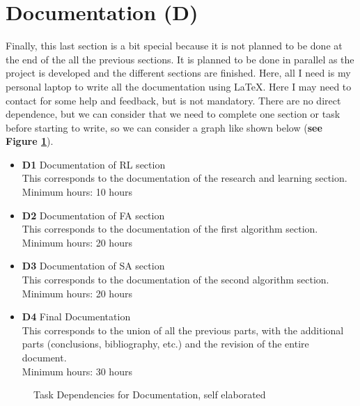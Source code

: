 \section{Documentation \textbf{(D)}}
Finally, this last section is a bit special because it is not planned to be done at the end of the all the previous sections.
It is planned to be done in parallel as the project is developed and the different sections are finished.
Here, all I need is my personal laptop to write all the documentation using \LaTeX.
Here I may need to contact for some help and feedback, but is not mandatory.
There are no direct dependence, but we can consider that we need to complete one section or task before starting to write, so we can consider a graph like shown below (\textbf{see Figure \ref{D_dependences}}).
\begin{itemize}
    \item \textbf{D1} Documentation of RL section \\
        This corresponds to the documentation of the research and learning section. \\
        Minimum hours: 10 hours
    \item \textbf{D2} Documentation of FA section\\
        This corresponds to the documentation of the first algorithm section. \\
        Minimum hours: 20 hours
    \item \textbf{D3} Documentation of SA section \\
        This corresponds to the documentation of the second algorithm section. \\
        Minimum hours: 20 hours
    \item \textbf{D4} Final Documentation \\
    This corresponds to the union of all the previous parts, with the additional parts (conclusions, bibliography, etc.) and the revision of the entire document. \\
    Minimum hours: 30 hours        
\end{itemize}
\begin{figure}[h]
    \centering
    \caption{Task Dependencies for Documentation, self elaborated}
    \label{D_dependences}
\end{figure}

